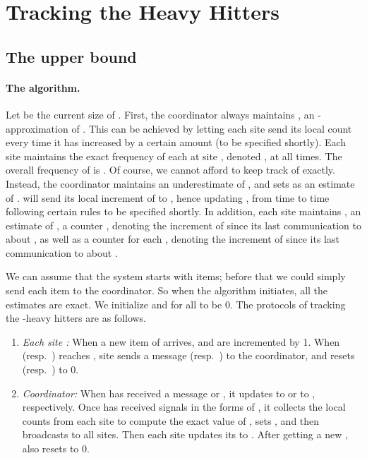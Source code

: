 \documentclass[10pt]{article}
\begin{document}
\section{Tracking the Heavy Hitters}
\label{sec:track-heavy-hitt}



\subsection{The upper bound}
\label{sec:upper-bound}
\paragraph{The algorithm.}
Let  be the current size of . First, the coordinator 
always maintains , an -approximation of .  This can
be achieved by letting each site send its local count every time
it has increased by a certain amount (to be specified shortly).
Each site  maintains the exact frequency of each  at
site , denoted , at all times. The overall frequency
of  is . Of course, we cannot afford to
keep track of  exactly.  Instead, the coordinator  maintains
an underestimate  of , and sets  as an estimate of .   will send its
local increment of  to , hence updating ,
from time to time following certain rules to be specified shortly.
In addition, each site  maintains , an estimate of
, a counter , denoting the increment of
 since its last communication to  about , as well
as a counter  for each , denoting the
increment of  since its last communication to  about
.

We can assume that the system starts with  items;
before that we could simply send each item to the coordinator.  So
when the algorithm initiates, all the estimates are exact. We
initialize  and  for all 
to be 0. The protocols of tracking the -heavy hitters are as
follows.
\begin{enumerate}
\item {\em Each site :} When a new item of  arrives,
 and  are incremented by 1.
When  (resp.\ ) reaches , site  sends a message  (resp.\ ) to the
coordinator, and resets  (resp.\
) to 0.

\item {\em Coordinator:} When  has received a message  or , it
updates  to  or  to
, respectively. Once  has
received  signals in the forms of , it collects the local counts from each site to compute
the exact value of , sets , and then broadcasts 
to all sites.  Then each site  updates its  to .
After getting a new ,  also resets  to
0.
\end{enumerate}
\end{document}
